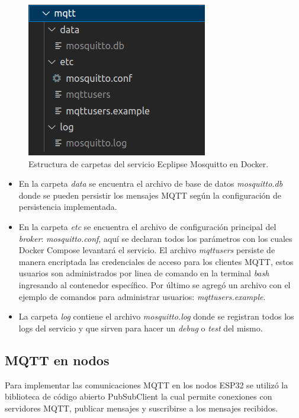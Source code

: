 \begin{figure}[H]
	\centering
	\includegraphics[scale=.60]{./Figures/mqtt-estructura-carpetas.png}
	\caption{Estructura de carpetas del servicio Ecplipse Mosquitto en Docker.}
	\label{fig:mqttestructuracarpetas}
\end{figure}

\begin{itemize}
	\item En la carpeta \textit{data} se encuentra el archivo de base de datos \textit{mosquitto.db} donde se pueden persistir los mensajes MQTT según la configuración de persistencia implementada.
	\item En la carpeta \textit{etc} se encuentra el archivo de configuración principal del \textit{broker}: \textit{mosquitto.conf}, aquí se declaran todos los parámetros con los cuales Docker Compose levantará el servicio. El archivo \textit{mqttusers} persiste de manera encriptada las credenciales de acceso para los clientes MQTT, estos usuarios son administrados por linea de comando en la terminal \textit{bash} ingresando al contenedor específico. Por último se agregó un archivo con el ejemplo de comandos para administrar usuarios: \textit{mqttusers.example}.
	\item La carpeta \textit{log} contiene el archivo \textit{mosquitto.log} donde se registran todos los logs del servicio y que sirven para hacer un \textit{debug} o \textit{test} del mismo.	
\end{itemize}


\subsection{MQTT en nodos}
\label{subsec:mqttnodos}
Para implementar las comunicaciones MQTT en los nodos ESP32 se utilizó la biblioteca de código abierto PubSubClient \citep{WEBSITE:pubsubclient} la cual permite conexiones con servidores MQTT, publicar mensajes y suscribirse a los mensajes recibidos.

